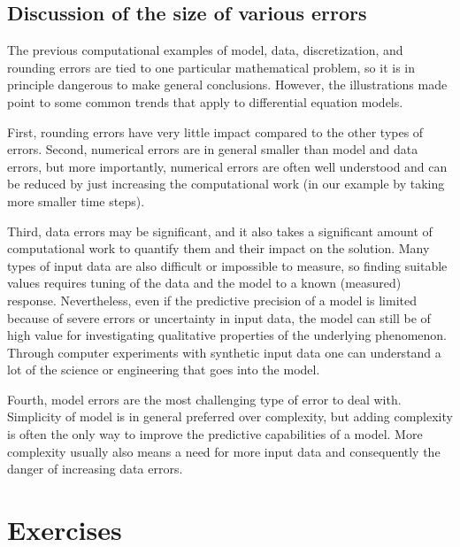 \documentclass[graybox,sectrefs,envcountresetchap,open=right,final]{svmonodo}
\begin{document}
\subsection{Discussion of the size of various errors}

The previous computational examples of model, data, discretization,
and rounding errors are tied to one particular mathematical problem,
so it is in principle dangerous to make general conclusions.  However,
the illustrations made point to some common trends that apply to
differential equation models.

First, rounding errors have very little impact compared to the other
types of errors.  Second, numerical errors are in general smaller than
model and data errors, but more importantly, numerical errors are
often well understood and can be reduced by just increasing the
computational work (in our example by taking more smaller time steps).

Third, data errors may be significant, and it also takes a significant
amount of computational work to quantify them and their impact on the
solution. Many types of input data are also difficult or impossible
to measure, so finding suitable values requires tuning of the data
and the model to a known (measured) response.
Nevertheless, even if the predictive precision of a model
is limited because of severe errors or uncertainty in input data, the
model can still be of high value for investigating qualitative
properties of the underlying phenomenon. Through computer experiments
with synthetic input data one can understand a lot of the science or
engineering that goes into the model.

Fourth, model errors are the most challenging type of error to deal
with. Simplicity of model is in general preferred over complexity,
but adding complexity is often the only way to improve the predictive
capabilities of a model. More complexity usually also means a need
for more input data and consequently the danger of increasing
data errors.

\section{Exercises}
\end{document}
